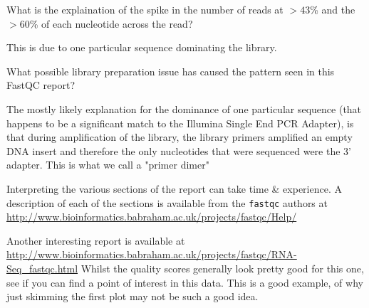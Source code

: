 \begin{questions}
What is the explaination of the spike in the number of reads at $>43$\% and the $>60$\% of each nucleotide across the read? \\
\begin{answer}
This is due to one particular sequence dominating the library.
\end{answer}
What possible library preparation issue has caused the pattern seen in this FastQC report?
\begin{answer}
The mostly likely explanation for the dominance of one particular sequence (that happens to be a significant match to the Illumina Single End PCR Adapter), is that during amplification of the library, the library primers amplified an empty DNA insert and therefore the only nucleotides that were sequenced were the 3' adapter.
This is what we call a "primer dimer"
\end{answer}
\end{questions}


\begin{information}
Interpreting the various sections of the report can take time \& experience.
A description of each of the sections is available from the \texttt{fastqc} authors at \url{http://www.bioinformatics.babraham.ac.uk/projects/fastqc/Help/}
\end{information}

\begin{bonus}
Another interesting report is available at \url{http://www.bioinformatics.babraham.ac.uk/projects/fastqc/RNA-Seq\_fastqc.html}
Whilst the quality scores generally look pretty good for this one, see if you can find a point of interest in this data.
This is a good example, of why just skimming the first plot may not be such a good idea.
\end{bonus}

